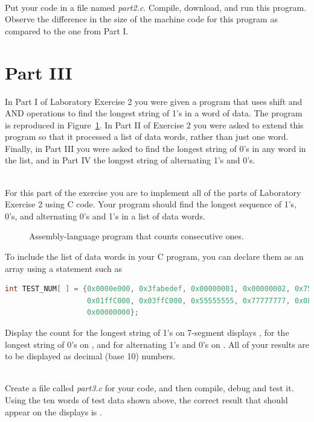 \documentclass[epsfig,10pt,fullpage]{article}
\begin{document}
~\\
Put your code in a file named {\it part2.c}.
Compile, download, and run this program. Observe the difference in the size of the
machine code for this program as compared to the one from Part I.

\section*{Part III}
In Part I of Laboratory Exercise 2 you were given a program that uses shift and AND operations
to find the longest string of 1's in a word of data. The program is reproduced in
Figure~\ref{fig:shiftAND}.  In Part II of Exercise 2 you were asked to extend
this program so that it processed a list of data words, rather than just one word.
Finally, in Part III you were asked to find the longest string of 0's in any word in the
list, and in Part IV the longest string of alternating 1's and 0's.

~\\
For this part of the exercise you are to implement all of the parts of Laboratory Exercise 2 
using C code. Your program should find the longest sequence of 1's, 0's, and alternating 0's and
1's in a list of data words.

\begin{figure}[H]
\begin{center}

\end{center}
\caption{Assembly-language program that counts consecutive ones.}
\label{fig:shiftAND}
\end{figure}

To include the list of data words in your C program, you can declare them as an array using
a statement such as

\begin{lstlisting}[language=C]
int TEST_NUM[ ] = {0x0000e000, 0x3fabedef, 0x00000001, 0x00000002, 0x75a5a5a5,
                   0x01ffC000, 0x03ffC000, 0x55555555, 0x77777777, 0x08888888,
                   0x00000000};
\end{lstlisting}


Display the count for the longest string of 1's on 7-segment displays , 
for the longest string of 0's on , and for alternating 1's and 0's 
on .  All of your results are to be displayed as decimal (base 10)
numbers.

~\\
Create a file called {\it part3.c} for your code, and then compile, debug and test it. 
Using the ten words of test data shown above, the correct
result that should appear on the  displays is .
\end{document}
